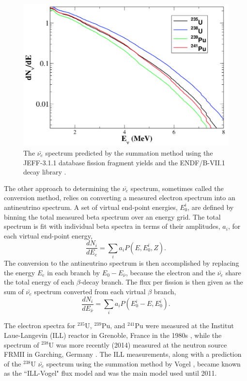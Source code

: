 \begin{figure}[t]
	\centering
	\includegraphics[width=0.65\linewidth]{tex/3-reactorneutrinos-images/Spectrum}
	\caption{The $\bar{\nu_e}$ spectrum predicted by the summation method using the JEFF-3.1.1 database fission fragment yields and the ENDF/B-VII.1 decay library \cite{HayesVogel}.}
	\label{fig:spectrum}
\end{figure}

The other approach to determining the $\bar{\nu_{e}}$ spectrum, sometimes called the conversion method, relies on converting a measured electron spectrum into an antineutrino spectrum. 
A set of virtual end-point energies, $E^i_0$, are defined by binning the total measured beta spectrum over an energy grid. 
The total spectrum is fit with individual beta spectra in terms of their amplitudes, $a_i$, for each virtual end-point energy, 
\begin{equation}
	\frac{dN_i}{dE_e} = \sum_{i}a_iP(E,E^i_0,Z).
\end{equation}
The conversion to the antineutrino spectrum is then accomplished by replacing the energy $E_e$ in each branch by $E_0 - E_{\bar{\nu}}$, because the electron and the $\bar{\nu_e}$ share the total energy of each $\beta$-decay branch.
The flux per fission is then given as the sum of $\bar{\nu_e}$ spectrum converted from each virtual $\beta$ branch,
\begin{equation}
	\frac{dN_i}{dE_{\bar{\nu}}} = \sum_{i}a_iP(E^i_0-E,E^i_0).
\end{equation}


The electron spectra for $^{235}$U, $^{239}$Pu, and $^{241}$Pu were measured at the Institut
Laue-Langevin (ILL) reactor in Grenoble, France in the 1980s \cite{VonFeilitzsch:1982jw,Schreckenbach:1985ep,Hahn:1989zr}, while the spectrum of $^{238}$U was more recently (2014) measured at the neutron source FRMII in Garching, Germany \cite{Haag:2013raa}.
The ILL measurements, along with a prediction of the $^{238}$U $\bar{\nu_{e}}$ spectrum using the summation method by Vogel \cite{PhysRevC.24.1543}, became known as the ``ILL-Vogel" flux model and was the main model used until 2011.

